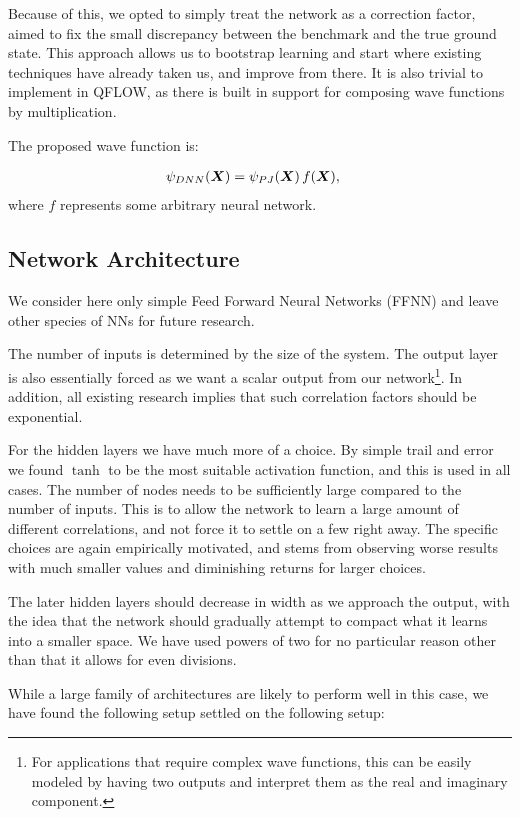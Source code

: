 \documentclass[Thesis.tex]{subfiles}
\begin{document}
Because of this, we opted to simply treat the network as a correction factor,
aimed to fix the small discrepancy between the benchmark and the true ground
state. This approach allows us to bootstrap learning and start where existing
techniques have already taken us, and improve from there. It is also trivial to
implement in QFLOW, as there is built in support for composing wave functions by
multiplication.

The proposed wave function is:

\begin{align}\label{eq:pade-dnn}
  \psi_{DNN}(\bm{X}) &= \psi_{PJ}(\bm{X})\, f(\bm{X}),
\end{align}
where $f$ represents some arbitrary neural network. 


\subsection{Network Architecture}

We consider here only simple Feed Forward Neural Networks (FFNN) and leave other
species of NNs for future research.

The number of inputs is determined by the size of the system.
The output layer is also essentially forced as we want a
scalar output from our network\footnote{For applications that require complex
  wave functions, this can be easily modeled by having two outputs and
  interpret them as the real and imaginary component.}. In addition, all
existing research implies that such correlation factors should be exponential.

For the hidden layers we have much more of a choice. By simple trail and error
we found $\tanh$ to be the most suitable activation function, and this is used
in all cases. The number of nodes needs to be sufficiently large compared to the
number of inputs. This is to allow the network to learn a large amount of
different correlations, and not force it to settle on a few right away.
The specific choices are again empirically motivated, and stems
from observing worse results with much smaller values and diminishing returns
for larger choices. 

The later hidden layers should decrease in width as we approach the output, with
the idea that the network should gradually attempt to compact what it learns
into a smaller space. We have used powers of two for no particular reason other
than that it allows for even divisions.

While a large family of architectures are likely to perform well in this case,
we have found the following setup settled on the following setup:
\end{document}
